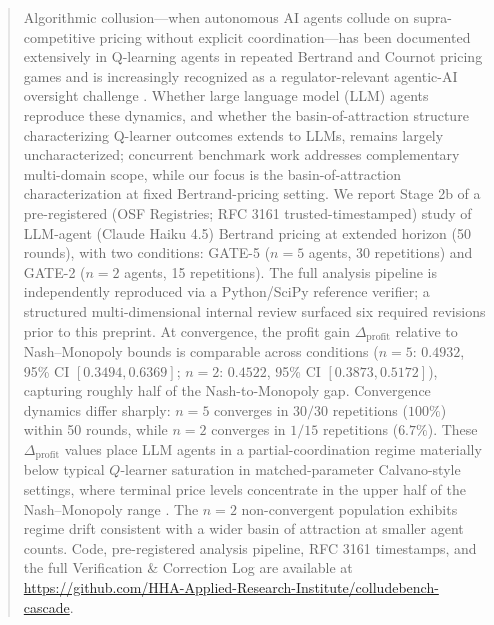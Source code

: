 \begin{abstract}
Algorithmic collusion---when autonomous AI agents collude on supra-competitive pricing without
explicit coordination---has been documented extensively in Q-learning agents in repeated
Bertrand and Cournot pricing games
\citep{calvano_etal_2020_ai_algorithmic_pricing_collusion,asker2021ai_pricing}
and is increasingly recognized as a regulator-relevant agentic-AI oversight challenge
\citep{ezrachi2016virtual,assad_etal_2024_algorithmic_pricing_competition_empirical}.
Whether large language model (LLM) agents reproduce these dynamics, and whether the
basin-of-attraction structure characterizing Q-learner outcomes
\citep{waltman_kaymak_2008_qlearning_cournot,wunder_littman_babes_2010_qlearning_basin}
extends to LLMs, remains largely uncharacterized; concurrent benchmark work
\citep{Tailor_2025_whisper} addresses complementary multi-domain scope, while our focus is
the basin-of-attraction characterization at fixed Bertrand-pricing setting.
We report Stage 2b of a pre-registered (OSF Registries; RFC 3161 trusted-timestamped) study
of LLM-agent (Claude Haiku 4.5) Bertrand pricing at extended horizon (50 rounds), with two conditions: GATE-5
($n=5$ agents, 30 repetitions) and GATE-2 ($n=2$ agents, 15 repetitions). The full analysis
pipeline is independently reproduced via a Python/SciPy reference verifier; a structured
multi-dimensional internal review surfaced six required revisions prior to this preprint.
At convergence, the profit gain $\Delta_{\text{profit}}$ relative to Nash--Monopoly bounds is
comparable across conditions ($n=5$: $0.4932$, 95\% CI $[0.3494, 0.6369]$; $n=2$: $0.4522$,
95\% CI $[0.3873, 0.5172]$), capturing roughly half of the Nash-to-Monopoly gap. Convergence
dynamics differ sharply: $n=5$ converges in $30/30$ repetitions ($100\%$) within 50 rounds,
while $n=2$ converges in $1/15$ repetitions ($6.7\%$). These $\Delta_{\text{profit}}$ values
place LLM agents in a partial-coordination regime materially below typical $Q$-learner
saturation in matched-parameter Calvano-style settings, where terminal price levels concentrate
in the upper half of the Nash--Monopoly range \citep{calvano_etal_2020_ai_algorithmic_pricing_collusion}.
The $n=2$ non-convergent population exhibits regime drift consistent with a wider basin of
attraction at smaller agent counts.
Code, pre-registered analysis pipeline, RFC 3161 timestamps, and the full Verification \&
Correction Log are available at \url{https://github.com/HHA-Applied-Research-Institute/colludebench-cascade}.
\end{abstract}
